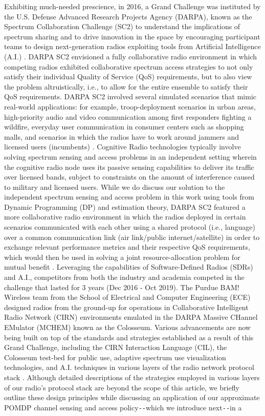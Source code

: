 \documentclass[12pt, draftcls, onecolumn]{IEEEtran}
\begin{document}
Exhibiting much-needed prescience, in 2016, a Grand Challenge was instituted by the U.S. Defense Advanced Research Projects Agency (DARPA), known as the Spectrum Collaboration Challenge (SC2) to understand the implications of spectrum sharing and to drive innovation in the space by encouraging participant teams to design next-generation radios exploiting tools from Artificial Intelligence (A.I.) \cite{DARPA:SC2}. DARPA SC2 envisioned a fully collaborative radio environment in which competing radios exhibited collaborative spectrum access strategies to not only satisfy their individual Quality of Service (QoS) requirements, but to also view the problem altruistically, i.e., to allow for the entire ensemble to satisfy their QoS requirements. DARPA SC2 involved several simulated scenarios that mimic real-world applications: for example, troop-deployment scenarios in urban areas, high-priority audio and video communication among first responders fighting a wildfire, everyday user communication in consumer centers such as shopping malls, and scenarios in which the radios have to work around jammers and licensed users (incumbents) \cite{DARPA:SC2scenarios}. Cognitive Radio technologies typically involve solving spectrum sensing and access problems in an independent setting wherein the cognitive radio node uses its passive sensing capabilities to deliver its traffic over licensed bands, subject to constraints on the amount of interference caused to military and licensed users. While we do discuss our solution to the independent spectrum sensing and access problem in this work using tools from Dynamic Programming (DP) and estimation theory, DARPA SC2 featured a more collaborative radio environment in which the radios deployed in certain scenarios communicated with each other using a shared protocol (i.e., language) over a common communication link (air link/public internet/satellite) in order to exchange relevant performance metrics and their respective QoS requirements, which would then be used in solving a joint resource-allocation problem for mutual benefit \cite{DARPA:SC2collaboration}. Leveraging the capabilities of Software-Defined Radios (SDRs) and A.I., competitors from both the industry and academia competed in the challenge that lasted for 3 years (Dec 2016 - Oct 2019). The Purdue BAM! Wireless team from the School of Electrical and Computer Engineering (ECE) designed radios from the ground-up for operations in Collaborative Intelligent Radio Network (CIRN) environments emulated in the DARPA Massive CHannel EMulator (MCHEM) known as the Colosseum. Various advancements are now being built on top of the standards and strategies established as a result of this Grand Challenge, including the CIRN Interaction Language (CIL), the Colosseum test-bed for public use, adaptive spectrum use visualization technologies, and A.I. techniques in various layers of the radio network protocol stack \cite{DARPASC2:end1,DARPASC2:end2,DARPASC2:end3,DARPASC2:end4}. Although detailed descriptions of the strategies employed in various layers of our radio's protocol stack are beyond the scope of this article, we briefly outline these design principles while discussing an application of our approximate POMDP channel sensing and access policy\texttt{-{}-}which we introduce next\texttt{-{}-}in a 
\end{document}
